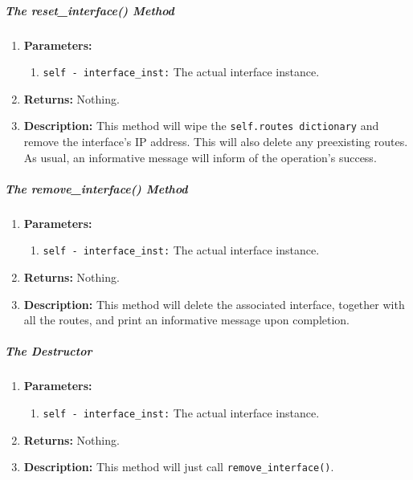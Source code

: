         \subparagraph{The reset\_interface() Method}
            \begin{enumerate}
                \item \textbf{Parameters:}
                \begin{enumerate}
                    \item \texttt{self - interface\_inst:} The actual interface instance.
                \end{enumerate}
                \item \textbf{Returns:} Nothing.
                \item \textbf{Description:} This method will wipe the \texttt{self.routes dictionary} and remove the interface's IP address. This will also delete any preexisting routes. As usual, an informative message will inform of the operation's success.
            \end{enumerate}

        \subparagraph{The remove\_interface() Method}
            \begin{enumerate}
                \item \textbf{Parameters:}
                \begin{enumerate}
                    \item \texttt{self - interface\_inst:} The actual interface instance.
                \end{enumerate}
                \item \textbf{Returns:} Nothing.
                \item \textbf{Description:} This method will delete the associated interface, together with all the routes, and print an informative message upon completion.
            \end{enumerate}

        \subparagraph{The Destructor}
            \begin{enumerate}
                \item \textbf{Parameters:}
                \begin{enumerate}
                    \item \texttt{self - interface\_inst:} The actual interface instance.
                \end{enumerate}
                \item \textbf{Returns:} Nothing.
                \item \textbf{Description:} This method will just call \texttt{remove\_interface()}.
            \end{enumerate}